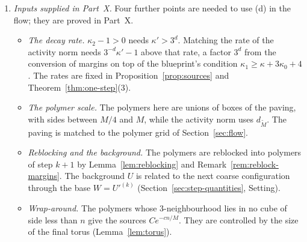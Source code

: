 \begin{remark}
\begin{enumerate}[label=(\alph*)]
\item \emph{Inputs supplied in Part~X.} Four further points are needed to use (d) in the flow; they are proved in Part~X.
  \begin{itemize}
  \item \emph{The decay rate.} $\kappa_2-1>0$ needs $\kappa'>3^d$. Matching the rate of the activity norm needs $3^{-d}\kappa'-1$ above that rate, a factor $3^d$ from the conversion of margins on top of the blueprint's condition $\kappa_1\ge\kappa+3\kappa_0+4$. The rates are fixed in Proposition~\ref{prop:sources} and Theorem~\ref{thm:one-step}(3).
  \item \emph{The polymer scale.} The polymers here are unions of boxes of the paving, with sides between $M/4$ and $M$, while the activity norm uses $d_{\tilde M}$. The paving is matched to the polymer grid of Section~\ref{sec:flow}.
  \item \emph{Reblocking and the background.} The polymers are reblocked into polymers of step $k+1$ by Lemma~\ref{lem:reblocking} and Remark~\ref{rem:reblock-margins}. The background $U$ is related to the next coarse configuration through the base $W=U'^{(k)}$ (Section~\ref{sec:step-quantities}, Setting).
  \item \emph{Wrap-around.} The polymers whose $3$-neighbourhood lies in no cube of side less than $n$ give the sources $Ce^{-cn/M}$. They are controlled by the size of the final torus (Lemma~\ref{lem:torus}).
  \end{itemize}
\end{enumerate}
\end{remark}

